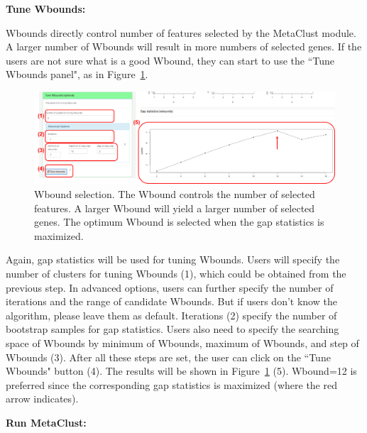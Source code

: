 \begin{steps}
\item \textbf{Tune Wbounds:} 

Wbounds directly control number of features selected by the MetaClust module.
A larger number of Wbounds will result in more numbers of selected genes.
If the users are not sure what is a good Wbound,
they can start to use the ``Tune Wbounds panel", 
as in Figure~\ref{fig:metaClusttuneW}.
\begin{figure}[H]
\begin{center}
\includegraphics[scale=0.5]{./figure/metaClust/tuneW.pdf}
\caption{Wbound selection.
The Wbound controls the number of selected features.
A larger Wbound will yield a larger number of selected genes.
The optimum Wbound is selected when the gap statistics is maximized.
}
\label{fig:metaClusttuneW}
\end{center}
\end{figure}
Again,
gap statistics will be used for tuning Wbounds.
Users will specify the number of clusters for tuning Wbounds {\color{red} (1)}, which could be obtained from the previous step.
In advanced options, users can further specify the number of iterations and the range of candidate Wbounds.
But if users don't know the algorithm, please leave them as default.
Iterations {\color{red} (2)} specify the number of bootstrap samples for gap statistics.
Users also need to specify the searching space of Wbounds by minimum of Wbounds, maximum of Wbounds, and step of Wbounds {\color{red} (3)}.
After all these steps are set,
the user can click on the ``Tune Wbounds" button {\color{red} (4)}.
The results will be shown in Figure~\ref{fig:metaClusttuneW} {\color{red} (5)}.
Wbound=12 is preferred since the corresponding gap statistics is maximized (where the red arrow indicates).

\item \textbf{Run MetaClust:} 


\end{steps}
